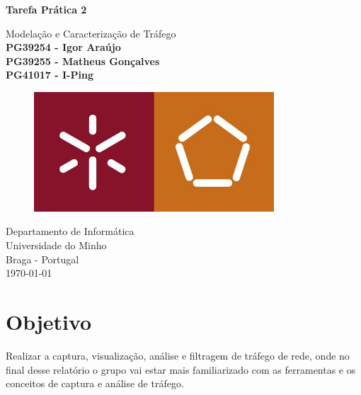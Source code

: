 \documentclass{llncs}
\begin{document}
  \begin{titlepage}           
  \end{titlepage}
  \begin{titlepage}
    \begin{center}
      \vspace*{1cm}
      \Huge
      \textbf{Tarefa Prática 2}
      \vspace{0.5cm}
      
      \LARGE
      Modelação e Caracterização de Tráfego
      \vspace{1.0cm}
      \small
      \textbf{\\PG39254 - Igor Araújo\\PG39255 - Matheus Gonçalves\\PG41017 - I-Ping}
      
      \vspace{1.0cm}
      \begin{figure}[ht]
      \includegraphics[width=0.8\textwidth]{uminho.jpg}
      \centering
      \end{figure}
      
      \vspace{4.5cm}
      Departamento de Informática\\
      Universidade do Minho\\
      Braga - Portugal\\
      \today
            
    \end{center}
  \end{titlepage}

  \tableofcontents

  \clearpage

  \section{Objetivo}
  Realizar a captura, visualização, análise e filtragem de tráfego de rede, onde 
  no final desse relatório o grupo vai estar mais familiarizado com as ferramentas e os conceitos de captura e análise de tráfego. 
\end{document}

